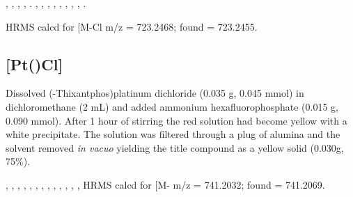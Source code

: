 ,
,
,
,
.
,
,
,
,
,
,
,
,
.

HRMS calcd for  [M-Cl\ce{]+} m/z = 723.2468; found = 723.2455.


\subsection*{[Pt(\tButhixantphosk)Cl]}


Dissolved (\tBu-Thixantphos)platinum dichloride (0.035 g, 0.045 mmol) in dichloromethane (2 mL) and added ammonium hexafluorophosphate (0.015 g, 0.090 mmol).  After 1 hour of stirring the red solution had become yellow with a white precipitate.  The solution was filtered through a plug of alumina and the solvent removed \emph{in vacuo} yielding the title compound as a yellow solid (0.030g, 75\%).  

,
,
,
,
,
,
,
,
,
,
,
,
,
HRMS calcd for  [M-\ce{PF6]+} m/z = 741.2032; found = 741.2069.


